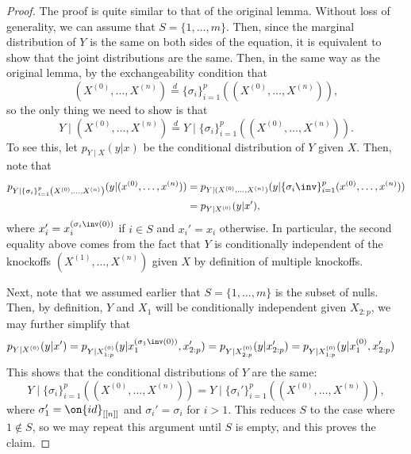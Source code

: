 \documentclass[12pt,reqno]{amsart}
\numberwithin{equation}{section}
\begin{document}
\begin{proof}
The proof is quite similar to that of the original lemma. Without loss of generality, we can assume that $S = \{ 1, \ldots, m \}$. Then, since the marginal distribution of $Y$ is the same on both sides of the equation, it is equivalent to show that the joint distributions are the same. Then, in the same way as the original lemma, by the exchangeability condition that \[ (X^{(0)}, \ldots, X^{(n)}) \overset{d}= \{ \sigma_i \}_{i=1}^p \left( (X^{(0)}, \ldots, X^{(n)}) \right),\] so the only thing we need to show is that 
\begin{equation}
Y \mid (X^{(0)}, \ldots, X^{(n)}) \overset{d}= Y \mid \{ \sigma_i \}_{i=1}^p \left( (X^{(0)}, \ldots, X^{(n)}) \right).
\end{equation}
To see this, let $p_{Y \mid X}(y|x)$ be the conditional distribution of $Y$ given $X$. Then, note that
\begin{align*}
p_{Y \mid \{ \sigma_i \}_{i=1}^p \left( X^{(0)}, \ldots, X^{(n)} \right)}(y | (x^{(0)}, \ldots , x^{(n)})) &= p_{Y \mid (X^{(0)}, \ldots, X^{(n)})} (y| \{ \sigma_i\inv \}_{i=1}^p (x^{(0)}, \ldots, x^{(n)}) ) \\
&= p_{Y \mid X^{(0)}} (y| x'),
\end{align*}
where $x_i' = x^{(\sigma_i\inv(0))}_i$ if $i \in S$ and $x_i' = x_i$ otherwise. In particular, the second equality above comes from the fact that $Y$ is conditionally independent of the knockoffs $(X^{(1)}, \ldots, X^{(n)})$ given $X$ by definition of multiple knockoffs.

Next, note that we assumed earlier that $S = \{ 1, \ldots, m \}$ is the subset of nulls. Then, by definition, $Y$ and $X_1$ will be conditionally independent given $X_{2 : p}$, we may further simplify that
\begin{align*}
p_{Y \mid X^{(0)}} (y| x') &= p_{Y \mid X^{(0)}_{1 : p}} (y | x^{(\sigma_1\inv(0))}_1, x'_{2 : p}) = p_{Y \mid X^{(0)}_{2 : p}} (y | x'_{2 : p}) = p_{Y \mid X^{(0)}_{1 : p}} (y | x_1^{(0)}, x'_{2 : p})
\end{align*}
This shows that the conditional distributions of $Y$ are the same:
\[ Y \mid \{ \sigma_i \}_{i=1}^p \left( (X^{(0)}, \ldots, X^{(n)}) \right) = Y \mid \{ \sigma_i' \}_{i=1}^p \left( (X^{(0)}, \ldots, X^{(n)}) \right), \] where $\sigma_1' = \on{id}_{[[n]]}$ and $\sigma_i' = \sigma_i$ for $i  > 1$. This reduces $S$ to the case where $1 \not \in S$, so we may repeat this argument until $S$ is empty, and this proves the claim.
\end{proof}
\end{document}
